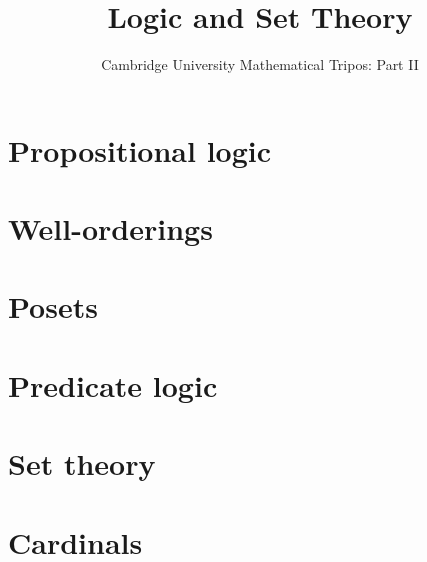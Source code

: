 \documentclass{article}
\title{Logic and Set Theory}
\author{Cambridge University Mathematical Tripos: Part II}
\begin{document}
\maketitle

\tableofcontentsnewpage{}

\section{Propositional logic}

\section{Well-orderings}

\section{Posets}

\section{Predicate logic}

\section{Set theory}

\section{Cardinals}

\end{document}
